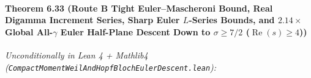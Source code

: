 \documentclass[
  11pt,
]{article}
\begin{document}
\paragraph{\texorpdfstring{Theorem 6.33 (Route B Tight Euler--Mascheroni
Bound, Real Digamma Increment Series, Sharp Euler \(L\)-Series Bounds,
and \(2.14\times\) Global All-\(\gamma\) Euler Half-Plane Descent Down
to \(\sigma \ge 7/2\)
(\(\operatorname{Re}(s) \ge 4\)))}{Theorem 6.33 (Route B Tight Euler--Mascheroni Bound, Real Digamma Increment Series, Sharp Euler L-Series Bounds, and 2.14\textbackslash times Global All-\textbackslash gamma Euler Half-Plane Descent Down to \textbackslash sigma \textbackslash ge 7/2 (\textbackslash operatorname\{Re\}(s) \textbackslash ge 4))}}\label{theorem-6.33-route-b-tight-eulermascheroni-bound-real-digamma-increment-series-sharp-euler-l-series-bounds-and-2.14times-global-all-gamma-euler-half-plane-descent-down-to-sigma-ge-72-operatornameres-ge-4}

\emph{Unconditionally in Lean 4 + Mathlib4
(\texttt{CompactMomentWeilAndHopfBlochEulerDescent.lean}):}
\end{document}
